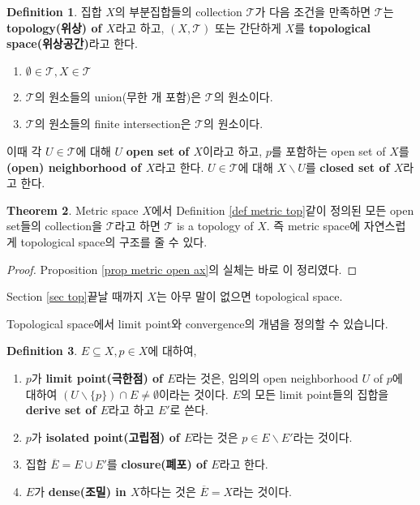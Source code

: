 \documentclass[12pt]{article}
\theoremstyle{definition}
\newtheorem{thm}{Theorem}[section]
\newtheorem{defn}[thm]{Definition}
\begin{document}
	\begin{defn}
		집합 \(X\)의 부분집합들의 collection \(\mathcal{T}\)가 다음 조건을 만족하면 \(\mathcal{T}\)는 \textbf{topology(위상) of \(X\)}라고 하고, \((X, \mathcal{T})\) 또는 간단하게 \(X\)를 \textbf{topological space(위상공간)}라고 한다.
		\begin{enumerate}[label=(TP\arabic*), leftmargin=2\parindent]
			\item
			\(\emptyset \in \mathcal{T}, X \in \mathcal{T}\)
			\item
			\(\mathcal{T}\)의 원소들의 union(무한 개 포함)은 \(\mathcal{T}\)의 원소이다.
			\item
			\(\mathcal{T}\)의 원소들의 finite intersection은 \(\mathcal{T}\)의 원소이다.
		\end{enumerate}
		이때 각 \(U \in \mathcal{T}\)에 대해 \(U\) \textbf{open set of \(X\)}이라고 하고, \(p\)를 포함하는 open set of \(X\)를 \textbf{(open) neighborhood of \(X\)}라고 한다. \(U \in \mathcal{T}\)에 대해 \(X \backslash U\)를 \textbf{closed set of \(X\)}라고 한다.
	\end{defn}

	\begin{thm}
		Metric space \(X\)에서 Definition \ref{def metric top}\과 같이 정의된 모든 open set들의 collection을 \(\mathcal{T}\)라고 하면 \(\mathcal{T}\) is a topology of \(X\). 즉 metric space에 자연스럽게 topological space의 구조를 줄 수 있다.
	\end{thm}
	\begin{proof}
		Proposition \ref{prop metric open ax}의 실체는 바로 이 정리였다.
	\end{proof}

Section \ref{sec top}\이 끝날 때까지 \(X\)는 아무 말이 없으면 topological space.

Topological space에서 limit point와 convergence의 개념을 정의할 수 있습니다.

	\begin{defn}
		\(E \subseteq X, p \in X\)에 대하여,
		\begin{enumerate}[label=(\alph*), leftmargin=2\parindent]
			\item
			\(p\)가 \textbf{limit point(극한점) of \(E\)}라는 것은, 임의의 open neighborhood \(U\) of \(p\)에 대하여 \((U \backslash \{p\}) \cap E \neq \emptyset\)이라는 것이다. \(E\)의 모든 limit point들의 집합을 \textbf{derive set of \(E\)}라고 하고 \(E'\)로 쓴다.
			\item
			\(p\)가 \textbf{isolated point(고립점) of \(E\)}라는 것은 \(p \in E \backslash E'\)라는 것이다.
			\item
			집합 \(\overline{E} = E \cup E'\)를 \textbf{closure(폐포) of \(E\)}라고 한다.
			\item
			\(E\)가 \textbf{dense(조밀) in \(X\)}하다는 것은 \(\overline{E} = X\)라는 것이다.
		\end{enumerate}
	\end{defn}
\end{document}
